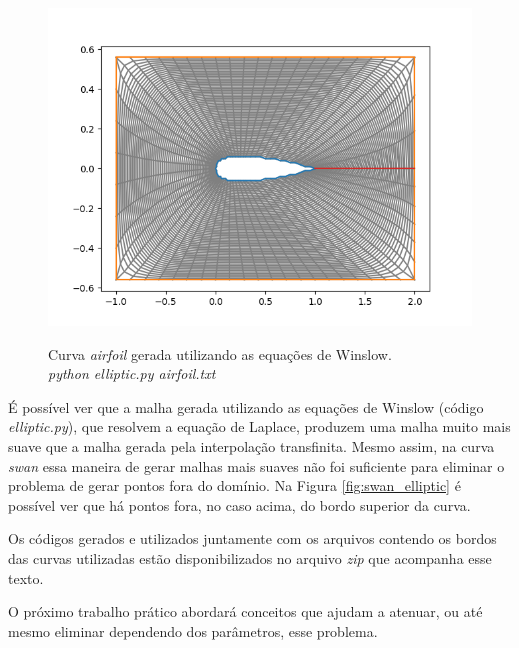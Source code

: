 \documentclass[a4paper]{article}
\begin{document}
\begin{figure}[]
	\centering
	\includegraphics[width=1.0\textwidth]{airfoil_elliptic.png}
	\label{fig:airfoil_elliptic} 
	\caption[caption]{Curva \textit{airfoil} gerada utilizando as equações de Winslow. \\\hspace{\textwidth} \textit{python elliptic.py airfoil.txt}}
\end{figure}


É possível ver que a malha gerada utilizando as equações de Winslow (código \textit{elliptic.py}), que resolvem a equação de Laplace, produzem uma malha muito mais suave que a malha gerada pela interpolação transfinita. Mesmo assim, na curva \textit{swan} essa maneira de gerar malhas mais suaves não foi suficiente para eliminar o problema de gerar pontos fora do domínio. Na Figura \ref{fig:swan_elliptic} é possível ver que há pontos fora, no caso acima, do bordo superior da curva. 

Os códigos gerados e utilizados juntamente com os arquivos contendo os bordos das curvas utilizadas estão disponibilizados no arquivo \textit{zip} que acompanha esse texto.

O próximo trabalho prático abordará conceitos que ajudam a atenuar, ou até mesmo eliminar dependendo dos parâmetros, esse problema.
\end{document}
